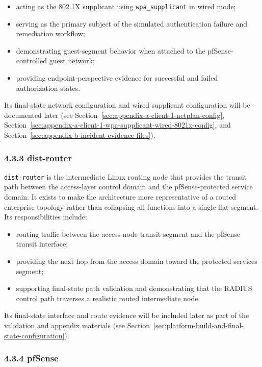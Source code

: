 \documentclass[11pt]{article}
\begin{document}
\begin{itemize}
    \item acting as the 802.1X supplicant using \texttt{wpa\_supplicant} in wired mode;
    \item serving as the primary subject of the simulated authentication failure and remediation workflow;
    \item demonstrating guest-segment behavior when attached to the pfSense-controlled guest network;
    \item providing endpoint-perspective evidence for successful and failed authorization states.
\end{itemize}

Its final-state network configuration and wired supplicant configuration will be documented later (see Section~\ref{sec:appendix-a-client-1-netplan-config}, Section~\ref{sec:appendix-a-client-1-wpa-supplicant-wired-8021x-config}, and Section~\ref{sec:appendix-b-incident-evidence-files}).

\subsubsection{4.3.3 dist-router}
\label{sec:dist-router-role}

\texttt{dist-router} is the intermediate Linux routing node that provides the transit path between the access-layer control domain and the pfSense-protected service domain. It exists to make the architecture more representative of a routed enterprise topology rather than collapsing all functions into a single flat segment. Its responsibilities include:

\begin{itemize}
    \item routing traffic between the access-node transit segment and the pfSense transit interface;
    \item providing the next hop from the access domain toward the protected services segment;
    \item supporting final-state path validation and demonstrating that the RADIUS control path traverses a realistic routed intermediate node.
\end{itemize}

Its final-state interface and route evidence will be included later as part of the validation and appendix materials (see Section~\ref{sec:platform-build-and-final-state-configuration}).

\subsubsection{4.3.4 pfSense}
\label{sec:pfsense-role}
\end{document}
